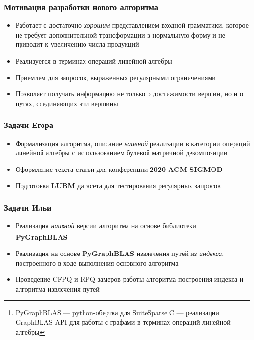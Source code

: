 \documentclass[xcolor=table,english]{beamer}
\begin{document}
\begin{frame}[fragile] \frametitle{Мотивация разработки нового алгоритма}
    \begin{itemize}
        \item Работает с достаточно \textit{хорошим} представлением входной грамматики, которое не требует дополнительной трансформации в нормальную форму и не приводит к увеличению числа продукций
        \item Реализуется в терминах операций линейной алгебры
        \item Приемлем для запросов, выраженных регулярными ограничениями
        \item Позволяет получать информацию не только о достижимости вершин, но и о путях, соединяющих эти вершины
    \end{itemize}
\end{frame}

\begin{frame}[fragile] \frametitle{Задачи Егора}
    \begin{itemize}
        \item Формализация алгоритма, описание \textit{наивной} реализации в категории операций линейной алгебры с использованием булевой матричной декомпозиции
        \item Оформление текста статьи для конференции \textbf{2020 ACM SIGMOD}
        \item Подготовка \textbf{LUBM} датасета для тестирования регулярных запросов
    \end{itemize}
\end{frame}

\begin{frame}[fragile] \frametitle{Задачи Ильи}
    \begin{itemize}
        \item Реализация \textit{наивной} версии алгоритма на основе библиотеки \textbf{PyGraphBLAS}\footnote{PyGraphBLAS --- python-обертка для SuiteSparse C --- реализации GraphBLAS API для работы с графами в терминах операций линейной алгебры}
        \item Реализация на основе \textbf{PyGraphBLAS} извлечения путей из \textit{индекса}, построенного в ходе выполнения основного алгоритма
        \item Проведение CFPQ и RPQ замеров работы алгоритма построения индекса и алгоритма извлечения путей
    \end{itemize}
\end{frame}
\end{document}
